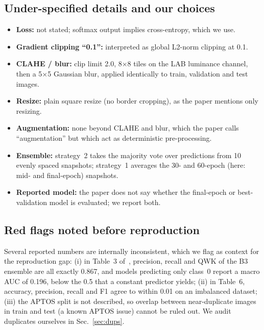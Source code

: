 \subsection{Under-specified details and our choices}
\begin{itemize}
\item \textbf{Loss:} not stated; softmax output implies cross-entropy, which we use.
\item \textbf{Gradient clipping ``0.1'':} interpreted as global L2-norm clipping at 0.1.
\item \textbf{CLAHE / blur:} clip limit 2.0, 8$\times$8 tiles on the LAB luminance channel, then a
5$\times$5 Gaussian blur, applied identically to train, validation and test images.
\item \textbf{Resize:} plain square resize (no border cropping), as the paper mentions only resizing.
\item \textbf{Augmentation:} none beyond CLAHE and blur, which the paper calls ``augmentation'' but which act as
deterministic pre-processing.
\item \textbf{Ensemble:} strategy~2 takes the majority vote over predictions from 10 evenly spaced
snapshots; strategy~1 averages the 30- and 60-epoch (here: mid- and final-epoch) snapshots.
\item \textbf{Reported model:} the paper does not say whether the final-epoch or best-validation model is
evaluated; we report both.
\end{itemize}

\subsection{Red flags noted before reproduction}
Several reported numbers are internally inconsistent, which we flag as context for the reproduction gap:
(i) in Table~3 of~\cite{chilukoti2024}, precision, recall and QWK of the B3 ensemble are all exactly 0.867,
and models predicting only class~0 report a macro AUC of 0.196, below the 0.5 that a constant predictor
yields; (ii) in Table~6, accuracy, precision, recall and F1 agree to within 0.01 on an imbalanced dataset;
(iii) the APTOS split is not described, so overlap between near-duplicate images in train and test (a
known APTOS issue) cannot be ruled out. We audit duplicates ourselves in Sec.~\ref{sec:dups}.
